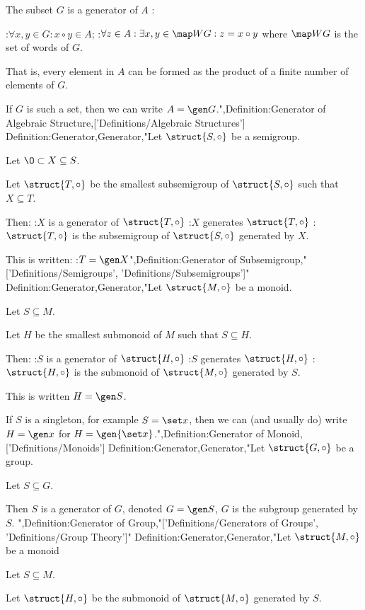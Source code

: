 The subset $G$ is a generator of $A$ :

:$\forall x, y \in G: x \circ y \in A$;
:$\forall z \in A: \exists x, y \in \map W G: z = x \circ y$
where $\map W G$ is the set of words of $G$.

That is, every element in $A$ can be formed as the product of a finite number of elements of $G$.


If $G$ is such a set, then we can write $A = \gen G$.",Definition:Generator of Algebraic Structure,['Definitions/Algebraic Structures']
Definition:Generator,Generator,"Let $\struct {S, \circ}$ be a semigroup.

Let $\O \subset X \subseteq S$.

Let $\struct {T, \circ}$ be the smallest subsemigroup of $\struct {S, \circ}$ such that $X \subseteq T$.


Then:
:$X$ is a generator  of $\struct {T, \circ}$
:$X$ generates $\struct {T, \circ}$
:$\struct {T, \circ}$ is the subsemigroup of $\struct {S, \circ}$ generated by $X$.


This is written:
:$T = \gen X$",Definition:Generator of Subsemigroup,"['Definitions/Semigroups', 'Definitions/Subsemigroups']"
Definition:Generator,Generator,"Let $\struct {M, \circ}$ be a monoid.

Let $S \subseteq M$.

Let $H$ be the smallest submonoid of $M$ such that $S \subseteq H$.


Then:
:$S$ is a generator of $\struct {H, \circ}$
:$S$ generates $\struct {H, \circ}$
:$\struct {H, \circ}$ is the submonoid of $\struct {M, \circ}$ generated by $S$.


This is written $H = \gen S$.


If $S$ is a singleton, for example $S = \set x$, then we can (and usually do) write $H = \gen x$ for $H = \gen {\set x}$.",Definition:Generator of Monoid,['Definitions/Monoids']
Definition:Generator,Generator,"Let $\struct {G, \circ}$ be a group.

Let $S \subseteq G$.


Then $S$ is a generator of $G$, denoted $G = \gen S$,  $G$ is the subgroup generated by $S$.
",Definition:Generator of Group,"['Definitions/Generators of Groups', 'Definitions/Group Theory']"
Definition:Generator,Generator,"Let $\struct {M, \circ}$ be a monoid

Let $S \subseteq M$.

Let $\struct {H, \circ}$ be the submonoid of $\struct {M, \circ}$ generated by $S$.

